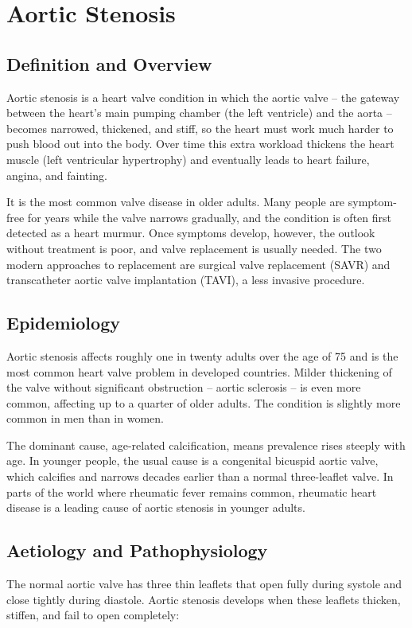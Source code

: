 \chapter{Aortic Stenosis}

\section*{Definition and Overview}
Aortic stenosis is a heart valve condition in which the aortic valve -- the gateway between the heart's main pumping chamber (the left ventricle) and the aorta -- becomes narrowed, thickened, and stiff, so the heart must work much harder to push blood out into the body. Over time this extra workload thickens the heart muscle (left ventricular hypertrophy) and eventually leads to heart failure, angina, and fainting.

It is the most common valve disease in older adults. Many people are symptom-free for years while the valve narrows gradually, and the condition is often first detected as a heart murmur. Once symptoms develop, however, the outlook without treatment is poor, and valve replacement is usually needed. The two modern approaches to replacement are surgical valve replacement (SAVR) and transcatheter aortic valve implantation (TAVI), a less invasive procedure.

\section*{Epidemiology}
Aortic stenosis affects roughly one in twenty adults over the age of 75 and is the most common heart valve problem in developed countries. Milder thickening of the valve without significant obstruction -- aortic sclerosis -- is even more common, affecting up to a quarter of older adults. The condition is slightly more common in men than in women.

The dominant cause, age-related calcification, means prevalence rises steeply with age. In younger people, the usual cause is a congenital bicuspid aortic valve, which calcifies and narrows decades earlier than a normal three-leaflet valve. In parts of the world where rheumatic fever remains common, rheumatic heart disease is a leading cause of aortic stenosis in younger adults.

\section*{Aetiology and Pathophysiology}
The normal aortic valve has three thin leaflets that open fully during systole and close tightly during diastole. Aortic stenosis develops when these leaflets thicken, stiffen, and fail to open completely:

